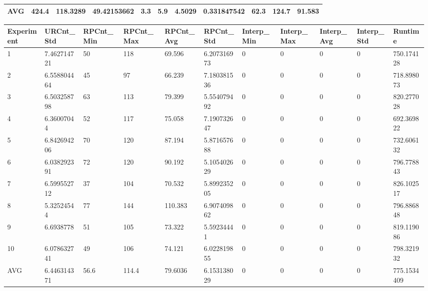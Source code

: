 \begin{table}[H]
\begin{adjustbox}{max width=380pt,keepaspectratio,angle=90}
\begin{tabular}{|l|l|l|l|l|l|l|l|l|l|l|}
						AVG        & 424.4     & 118.3289  & 49.42153662 & 3.3          & 5.9          & 4.5029       & 0.331847542  & 62.3       & 124.7      & 91.583     \\ \hline
					\end{tabular}	
				\end{adjustbox}
				\begin{adjustbox}{max width=380pt,keepaspectratio,angle=90}
					\begin{tabular}{|l|l|l|l|l|l|l|l|l|l|l|}
						\rowcolor[HTML]{EFEFEF} 
						\hline
						Experiment & URCnt\_Std  & RPCnt\_Min & RPCnt\_Max & RPCnt\_Avg & RPCnt\_Std  & Interp\_Min & Interp\_Max & Interp\_Avg & Interp\_Std & Runtime     \\ \hline
						1          & 7.462714721 & 50         & 118        & 69.596     & 6.207316973 & 0           & 0           & 0           & 0           & 750.174128  \\ \hline
						2          & 6.558804464 & 45         & 97         & 66.239     & 7.180381536 & 0           & 0           & 0           & 0           & 718.898073  \\ \hline
						3          & 6.503258798 & 63         & 113        & 79.399     & 5.554079492 & 0           & 0           & 0           & 0           & 820.277028  \\ \hline
						4          & 6.36007044  & 52         & 117        & 75.058     & 7.190732647 & 0           & 0           & 0           & 0           & 692.369822  \\ \hline
						5          & 6.842694206 & 70         & 120        & 87.194     & 5.871657688 & 0           & 0           & 0           & 0           & 732.606132  \\ \hline
						6          & 6.038292391 & 72         & 120        & 90.192     & 5.105402629 & 0           & 0           & 0           & 0           & 796.778843  \\ \hline
						7          & 6.599552712 & 37         & 104        & 70.532     & 5.899235205 & 0           & 0           & 0           & 0           & 826.102517  \\ \hline
						8          & 5.32524544  & 77         & 144        & 110.383    & 6.907409862 & 0           & 0           & 0           & 0           & 796.886848  \\ \hline
						9          & 6.6938778   & 51         & 105        & 73.322     & 5.59234441  & 0           & 0           & 0           & 0           & 819.119086  \\ \hline
						10         & 6.078632741 & 49         & 106        & 74.121     & 6.022819855 & 0           & 0           & 0           & 0           & 798.321932  \\ \hline\hline
						AVG        & 6.446314371 & 56.6       & 114.4      & 79.6036    & 6.153138029 & 0           & 0           & 0           & 0           & 775.1534409 \\ \hline
					\end{tabular}
				\end{adjustbox}	
			\end{table}

